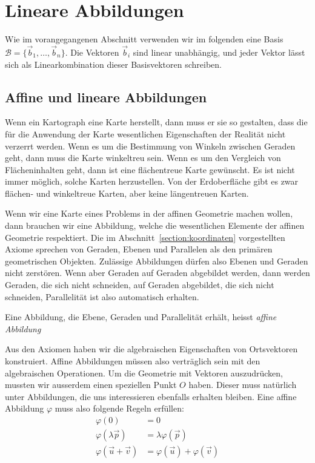 %
%
%
\section{Lineare Abbildungen%
\label{section:lineare abbildungen}}
Wie im vorangegangenen Abschnitt verwenden wir im folgenden eine Basis
$\mathcal{B}=\{\vec{b}_1,\dots,\vec{b}_n\}$.
Die Vektoren $\vec{b}_i$
sind linear unabhängig, und jeder Vektor lässt sich als Linearkombination
dieser Basisvektoren schreiben.

%
%
\subsection{Affine und lineare Abbildungen}
Wenn ein Kartograph eine Karte herstellt, dann muss er sie so
gestalten, dass die für die Anwendung der Karte wesentlichen
Eigenschaften der Realität nicht verzerrt werden.
Wenn es um die Bestimmung von Winkeln zwischen Geraden geht, dann
muss die Karte winkeltreu sein.
Wenn es um den Vergleich von Flächeninhalten geht, dann ist eine
flächentreue Karte gewünscht.
Es ist nicht immer möglich, solche Karten herzustellen. 
Von der Erdoberfläche gibt es zwar flächen- und winkeltreue Karten,
aber keine längentreuen Karten.

Wenn wir eine Karte eines Problems in der affinen Geometrie machen wollen,
dann brauchen wir eine Abbildung, welche die wesentlichen
Elemente der affinen Geometrie respektiert.
Die im Abschnitt~\ref{section:koordinaten} vorgestellten Axiome
sprechen von Geraden, Ebenen und Parallelen als den primären geometrischen
Objekten.
Zulässige Abbildungen dürfen also Ebenen und Geraden nicht zerstören.
Wenn aber Geraden auf Geraden abgebildet werden, dann werden Geraden,
die sich nicht schneiden, auf Geraden abgebildet, die sich nicht schneiden,
Parallelität ist also automatisch erhalten.

\begin{definition}
Eine Abbildung, die Ebene, Geraden und Parallelität erhält,
heisst {\em affine Abbildung}
\end{definition}

Aus den Axiomen haben wir die algebraischen Eigenschaften von Ortsvektoren
konstruiert.
Affine Abbildungen müssen also verträglich sein mit den algebraischen
Operationen.
Um die Geometrie mit Vektoren auszudrücken, mussten wir ausserdem
einen speziellen Punkt $O$ haben.
Dieser muss natürlich unter Abbildungen, die uns interessieren
ebenfalls erhalten bleiben.
Eine affine Abbildung $\varphi$ muss also folgende Regeln erfüllen:
\begin{align*}
\varphi(0)&=0
\\
\varphi(\lambda\vec{p})&=\lambda\varphi(\vec{p})
\\
\varphi(\vec{u}+\vec{v})&=\varphi(\vec{u}) + \varphi(\vec{v})
\end{align*}


